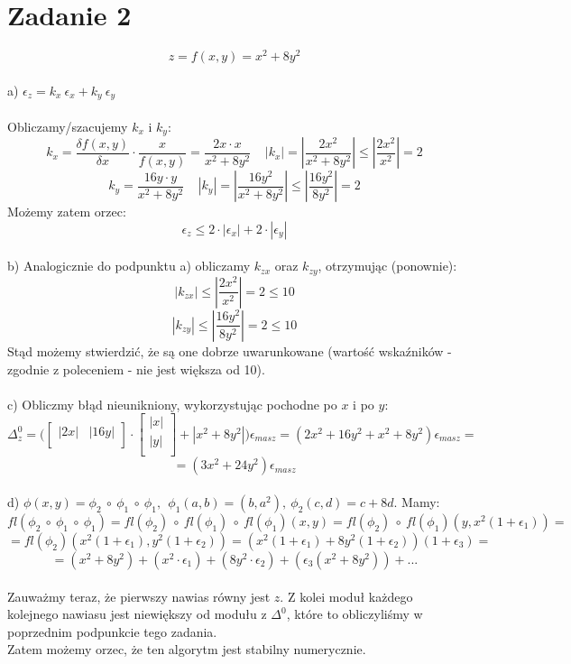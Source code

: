 \documentclass{article}
\begin{document}
\section*{Zadanie 2}

$$z = f(x,y) = x^2 + 8y^2$$ \\
a) $\epsilon_z = k_x \ \epsilon_x + k_y \ \epsilon_y$ \\ \\
Obliczamy/szacujemy $k_x$ i $k_y$:
$$k_x = \frac{\delta f(x,y)}{\delta x} \cdot \frac{x}{f(x,y)} = \frac{2x \cdot x}{x^2 +8y^2} \ \ \ \ \ |k_x| = |\frac{2x^2}{x^2 + 8y^2}| \leq |\frac{2x^2}{x^2}| = 2$$
$$k_y = \frac{16y \cdot y}{x^2 +8y^2} \ \ \ \ \ |k_y| = |\frac{16y^2}{x^2 + 8y^2}| \leq |\frac{16y^2}{8y^2}| = 2$$ 
Możemy zatem orzec:
$$\epsilon_z \leq 2 \cdot |\epsilon_x| + 2 \cdot |\epsilon_y|$$ \\
b) Analogicznie do podpunktu a) obliczamy $k_{zx}$ oraz $k_{zy}$, otrzymując (ponownie):
$$|k_{zx}| \leq |\frac{2x^2}{x^2}| = 2 \leq 10 $$
$$|k_{zy}| \leq |\frac{16y^2}{8y^2}| = 2 \leq 10 $$
Stąd możemy stwierdzić, że są one dobrze uwarunkowane (wartość wskaźników - zgodnie z poleceniem - nie jest większa od 10). \\ \\
c) Obliczmy błąd nieunikniony, wykorzystując pochodne po $x$ i po $y$:
$$\Delta^{0}_{z} = \Big(
\left[ \begin{array}{cc}
|2x| & |16y|\\
\end{array} \right] \cdot
\left[ \begin{array}{c}
|x| \\
|y| \\
\end{array} \right] + |x^2+8y^2| \Big) \epsilon_{masz} = (2x^2 + 16y^2 +x^2+8y^2) \epsilon_{masz} = $$
$$= (3x^2 + 24y^2) \epsilon_{masz}$$ \\
d) $\phi(x,y) = \phi_2 \ \circ \ \phi_1 \ \circ \ \phi_1, \ \ \phi_1(a,b) = (b,a^2), \ \phi_2(c, d) = c+8d$.
Mamy:
$$fl(\phi_2 \ \circ \ \phi_1 \ \circ \ \phi_1) = fl(\phi_2) \ \circ \ fl(\phi_1) \ \circ \ fl(\phi_1) (x,y) = fl(\phi_2) \ \circ \ fl(\phi_1) (y, x^2(1+\epsilon_1)) = $$
$$= fl(\phi_2)(x^2(1+\epsilon_1), y^2(1+\epsilon_2)) = (x^2(1+\epsilon_1)+8y^2(1+\epsilon_2))(1+\epsilon_3) = $$
$$= (x^2+8y^2) + (x^2 \cdot \epsilon_1) + (8y^2 \cdot \epsilon_2) + (\epsilon_3(x^2+8y^2)) + ...$$ \\
Zauważmy teraz, że pierwszy nawias równy jest $z$. Z kolei moduł każdego kolejnego nawiasu jest niewiększy od modułu z $\Delta^{0}$, które to obliczyliśmy w poprzednim podpunkcie tego zadania. \\
Zatem możemy orzec, że ten algorytm jest stabilny numerycznie.
\end{document}
